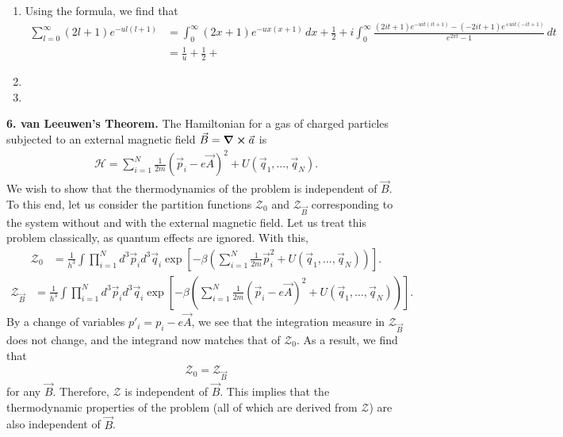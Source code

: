 \documentclass{article}
\theoremstyle{definition}
\newcommand{\ham}{\mathcal{H}}
\newcommand{\be}{\beta}
\newcommand{\f}[2]{\frac{#1}{#2}}
\newcommand{\lp}{\left(}
\newcommand{\rp}{\right)}
\newcommand{\lb}{\left[}
\newcommand{\rb}{\right]}
\begin{document}
\begin{enumerate}[label=(\alph*)]
	\item Using the formula, we find that 
	\begin{align*}
	\sum^\infty_{l=0} (2l+1) e^{-ul(l+1)} 
	&=   \int^\infty_0 (2x+1) e^{-ux(x+1)} \,dx + \f{1}{2} + i\int^\infty_0 \f{(2it+1) e^{-uit(it+1)}  - (-2it+1) e^{+uit(-it+1)} }{e^{2\pi t} - 1}\,dt \\
	&= \f{1}{u} + \f{1}{2} + 
	\end{align*}
	\item 
	\item 
\end{enumerate}

\noindent \textbf{6. van Leeuwen's Theorem.} The Hamiltonian for a gas of charged particles subjected to an external magnetic field $\vec{B} = \curl \vec{a}$ is 
\begin{align*}
\ham = \sum^N_{i=1} \f{1}{2m}(\vec{p}_i - e\vec{A})^2 + U(\vec{q}_1, \dots, \vec{q}_N).
\end{align*}
We wish to show that the thermodynamics of the problem is independent of $\vec{B}$. To this end, let us consider the partition functions $\mathcal{Z}_0$ and $\mathcal{Z}_{\vec{B}}$ corresponding to the system without and with the external magnetic field. Let us treat this problem classically, as quantum effects are ignored. With this, 
\begin{align*}
\mathcal{Z}_0 
&= \f{1}{h^3} \int \prod^N_{i=1} d^3\vec{p}_i d^3 \vec{q}_i \exp\lb -\be \lp 
\sum^N_{i=1} \f{1}{2m}\vec{p}_i^2 + U(\vec{q}_1, \dots, \vec{q}_N) \rp \rb.
\end{align*}
\begin{align*}
\mathcal{Z}_{\vec{B}}
&= \f{1}{h^3} \int \prod^N_{i=1} d^3\vec{p}_i d^3 \vec{q}_i \exp\lb -\be \lp 
\sum^N_{i=1} \f{1}{2m}(\vec{p}_i - e\vec{A})^2 + U(\vec{q}_1, \dots, \vec{q}_N) \rp \rb.
\end{align*}
By a change of variables $p'_i = p_i - e\vec{A}$, we see that the integration measure in $\mathcal{Z}_{\vec{B}}$ does not change, and the integrand now matches that of $\mathcal{Z}_0$. As a result, we find that
\begin{align*}
\mathcal{Z}_0 = \mathcal{Z}_{\vec{B}}
\end{align*}
for any $\vec{B}$. Therefore, $\mathcal{Z}$ is independent of $\vec{B}$. This implies that the thermodynamic properties of the problem (all of which are derived from $\mathcal{Z}$) are also independent of $\vec{B}$. \\ 
\end{document}
